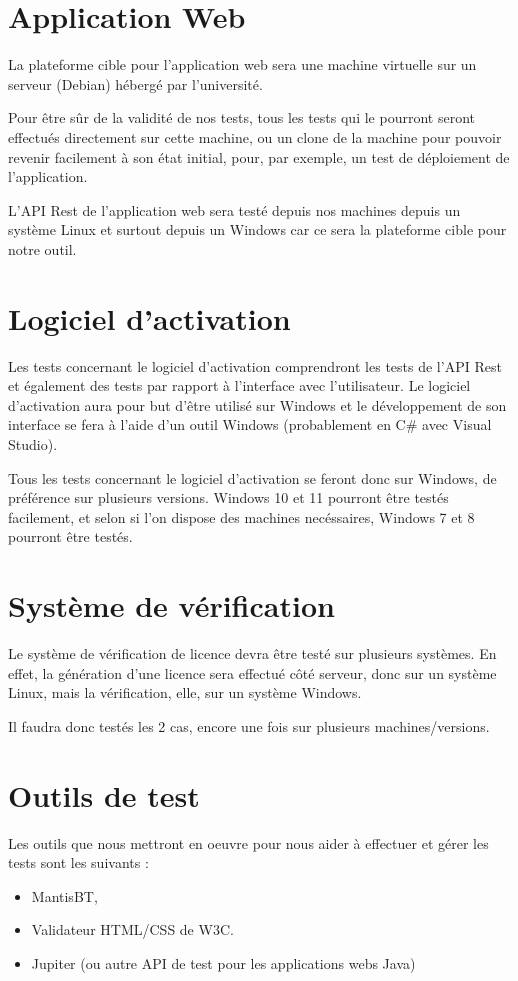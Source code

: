 \section{Application Web}
La plateforme cible pour l'application web sera une machine virtuelle sur un serveur (Debian)
hébergé par l'université.

Pour être sûr de la validité de nos tests, tous les tests qui le pourront seront effectués
directement sur cette machine, ou un clone de la machine pour pouvoir revenir facilement à son
état initial, pour, par exemple, un test de déploiement de l'application.

L'API Rest de l'application web sera testé depuis nos machines depuis un système Linux et surtout
depuis un Windows car ce sera la plateforme cible pour notre outil.

\section{Logiciel d'activation}
Les tests concernant le logiciel d'activation comprendront les tests de l'API Rest et également
des tests par rapport à l'interface avec l'utilisateur. Le logiciel d'activation aura pour but
d'être utilisé sur Windows et le développement de son interface se fera à l'aide d'un outil Windows
(probablement en C\# avec Visual Studio).

Tous les tests concernant le logiciel d'activation se feront donc sur Windows, de préférence
sur plusieurs versions. Windows 10 et 11 pourront être testés facilement, et selon si l'on dispose
des machines necéssaires, Windows 7 et 8 pourront être testés.

\section{Système de vérification}
Le système de vérification de licence devra être testé sur plusieurs systèmes. En effet, la
génération d'une licence sera effectué côté serveur, donc sur un système Linux, mais la
vérification, elle, sur un système Windows.

Il faudra donc testés les 2 cas, encore une fois sur plusieurs machines/versions.
\newpage

\section{Outils de test}
Les outils que nous mettront en oeuvre pour nous aider à effectuer et gérer les tests sont les
suivants :
\begin{itemize}
    \item MantisBT,
    \item Validateur HTML/CSS de W3C.
    \item Jupiter (ou autre API de test pour les applications webs Java)
\end{itemize}


